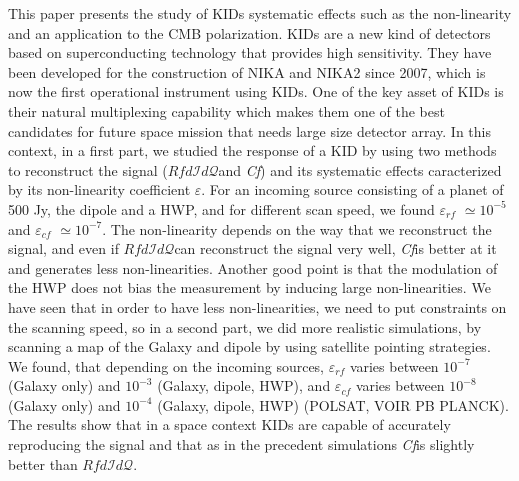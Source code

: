\documentclass[twocolumn, traditabstract]{aa}
\newcommand{\eps}{$\varepsilon$}
\newcommand{\rf}{$Rfd\mathcal{I}d\mathcal{Q}$}
\newcommand{\cf}{{\it Cf}}
\begin{document}
This paper presents the study of KIDs systematic effects such as the non-linearity and an application to the CMB polarization. 
KIDs are a new kind of detectors based on superconducting technology that provides high sensitivity. They have been developed for the construction of NIKA and NIKA2 since 2007, which is now the first operational instrument using KIDs. One of the key asset of KIDs is their natural multiplexing capability which makes them one of the best candidates for future space mission that needs large size detector array. In this context, in a first part, we studied the response of a KID by using two methods to reconstruct the signal (\rf and \cf) and its systematic effects caracterized by its non-linearity coefficient \eps. For an incoming source consisting of a planet of 500 Jy, the dipole and a HWP, and for different scan speed, we found $\varepsilon_{rf}$ $\simeq 10^{-5}$ and $\varepsilon_{cf}$ $\simeq 10^{-7}$. The non-linearity depends on the way that we reconstruct the signal, and even if \rf can reconstruct the signal very well, \cf is better at it and generates less non-linearities. Another good point is that the modulation of the HWP does not bias the measurement by inducing large non-linearities. We have seen that in order to have less non-linearities, we need to put constraints on the scanning speed, so in a second part, we did more realistic simulations, by scanning a map of the Galaxy and dipole by using satellite pointing strategies. We found, that depending on the incoming sources, $\varepsilon_{rf}$ varies between $10^{-7}$ (Galaxy only) and $10^{-3}$ (Galaxy, dipole, HWP), and $\varepsilon_{cf}$ varies between $10^{-8}$ (Galaxy only) and $10^{-4}$ (Galaxy, dipole, HWP) (POLSAT, VOIR PB PLANCK). The results show that in a space context KIDs are capable of accurately reproducing the signal and that as in the precedent simulations \cf is slightly better than \rf.\\
\end{document}
